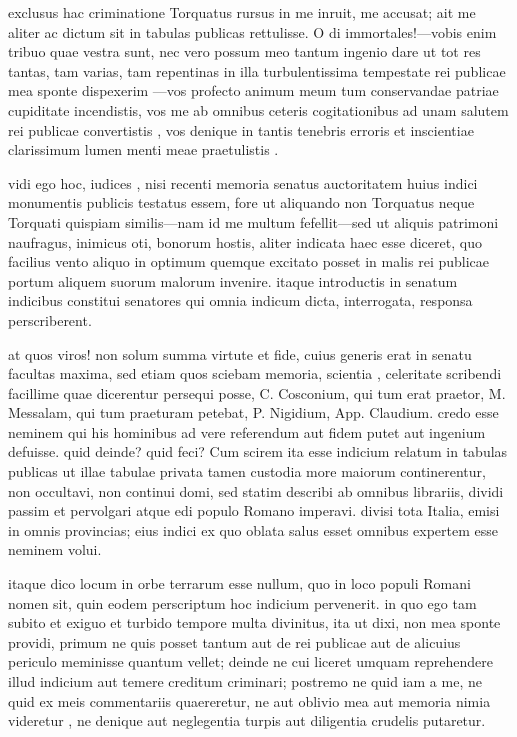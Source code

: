  exclusus hac criminatione Torquatus rursus in me inruit, me accusat; ait me aliter ac dictum sit in tabulas publicas rettulisse. O di immortales!—vobis enim tribuo quae vestra sunt, nec vero possum meo tantum ingenio dare ut tot res tantas, tam varias, tam repentinas in illa turbulentissima tempestate rei publicae mea sponte dispexerim —vos profecto animum meum tum conservandae patriae cupiditate incendistis, vos me ab omnibus ceteris cogitationibus ad unam salutem rei publicae convertistis , vos denique in tantis tenebris erroris et inscientiae clarissimum lumen menti meae praetulistis .

 vidi ego hoc, iudices , nisi recenti memoria senatus auctoritatem huius indici monumentis publicis testatus essem, fore ut aliquando non Torquatus neque Torquati quispiam similis—nam id me multum fefellit—sed ut aliquis patrimoni naufragus, inimicus oti, bonorum hostis, aliter indicata haec esse diceret, quo facilius vento aliquo in optimum quemque excitato posset in malis rei publicae portum aliquem suorum malorum invenire. itaque introductis in senatum indicibus constitui senatores qui omnia indicum dicta, interrogata, responsa perscriberent.

 at quos viros! non solum summa virtute et fide, cuius generis erat in senatu facultas maxima, sed etiam quos sciebam memoria, scientia , celeritate scribendi facillime quae dicerentur persequi posse, C. Cosconium, qui tum erat praetor, M. Messalam, qui tum praeturam petebat, P. Nigidium, App. Claudium. credo esse neminem qui his hominibus ad vere referendum aut fidem putet aut ingenium defuisse. quid deinde? quid feci? Cum scirem ita esse indicium relatum in tabulas publicas ut illae tabulae privata tamen custodia more maiorum continerentur, non occultavi, non continui domi, sed statim describi ab omnibus librariis, dividi passim et pervolgari atque edi populo Romano imperavi. divisi tota Italia, emisi in omnis provincias; eius indici ex quo oblata salus esset omnibus expertem esse neminem volui.

 itaque dico locum in orbe terrarum esse nullum, quo in loco populi Romani nomen sit, quin eodem perscriptum hoc indicium pervenerit. in quo ego tam subito et exiguo et turbido tempore multa divinitus, ita ut dixi, non mea sponte providi, primum ne quis posset tantum aut de rei publicae aut de alicuius periculo meminisse quantum vellet; deinde ne cui liceret umquam reprehendere illud indicium aut temere creditum criminari; postremo ne quid iam a me, ne quid ex meis commentariis quaereretur, ne aut oblivio mea aut memoria nimia videretur , ne denique aut neglegentia turpis aut diligentia crudelis putaretur.

